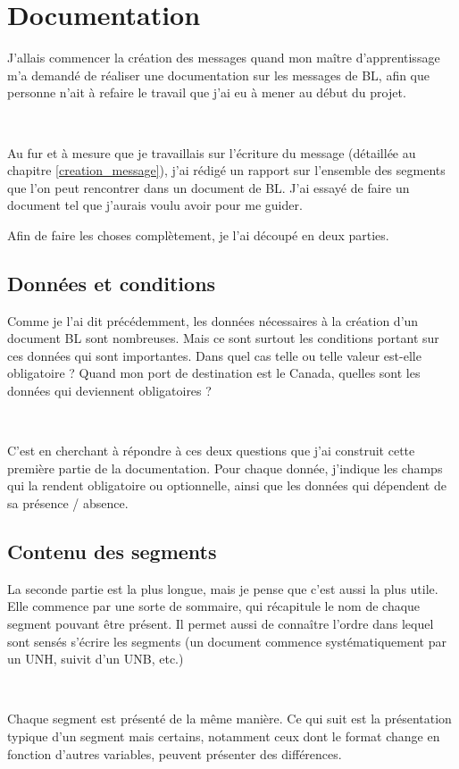 \chapter{Documentation}
J'allais commencer la création des messages quand mon maître d'apprentissage m'a demandé de réaliser une documentation sur les messages de BL, afin que personne n'ait à refaire le travail que j'ai eu à mener au début du projet.

~

Au fur et à mesure que je travaillais sur l'écriture du message (détaillée au chapitre \ref{creation_message}), j'ai rédigé un rapport sur l'ensemble des segments que l'on peut rencontrer dans un document de BL. J'ai essayé de faire un document tel que j'aurais voulu avoir pour me guider.

Afin de faire les choses complètement, je l'ai découpé en deux parties.


\section{Données et conditions}
Comme je l'ai dit précédemment, les données nécessaires à la création d'un document BL sont nombreuses. Mais ce sont surtout les conditions portant sur ces données qui sont importantes. Dans quel cas telle ou telle valeur est-elle obligatoire ? Quand mon port de destination est le Canada, quelles sont les données qui deviennent obligatoires ?

~

C'est en cherchant à répondre à ces deux questions que j'ai construit cette première partie de la documentation. Pour chaque donnée, j'indique les champs qui la rendent obligatoire ou optionnelle, ainsi que les données qui dépendent de sa présence / absence.


\section{Contenu des segments}
La seconde partie est la plus longue, mais je pense que c'est aussi la plus utile. Elle commence par une sorte de sommaire, qui récapitule le nom de chaque segment pouvant être présent. Il permet aussi de connaître l'ordre dans lequel sont sensés s'écrire les segments (un document commence systématiquement par un UNH, suivit d'un UNB, etc.)

~

Chaque segment est présenté de la même manière. Ce qui suit est la présentation typique d'un segment mais certains, notamment ceux dont le format change en fonction d'autres variables, peuvent présenter des différences.

